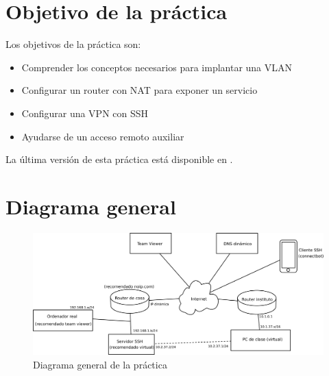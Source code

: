 
\usepackage{eurosym}


\renewcommand{\hmwkClass}{Planificación y Administración de Redes}
\renewcommand{\hmwkTitle}{VPN con SSH a casa}









\primerapagina

\setlength{\parindent}{0em}
\setlength{\parskip}{1em} 

\newcommand{\reddecasa}{192.168.1}

\section{Objetivo de la práctica}
Los objetivos de la práctica son:
\begin{itemize}
\item Comprender los conceptos necesarios para implantar una VLAN
\item Configurar un router con NAT para exponer un servicio
\item Configurar una VPN con SSH
\item Ayudarse de un acceso remoto auxiliar
\end{itemize}


La última versión de esta práctica está disponible en .


\section{Diagrama general}

\begin{figure}[h]
  \begin{center}
    \includegraphics[width=.9\textwidth]{./media/practica-vpn-general.pdf}
  \end{center}
  \caption{Diagrama general de la práctica}\label{fig:diagrama-general}
\end{figure}


